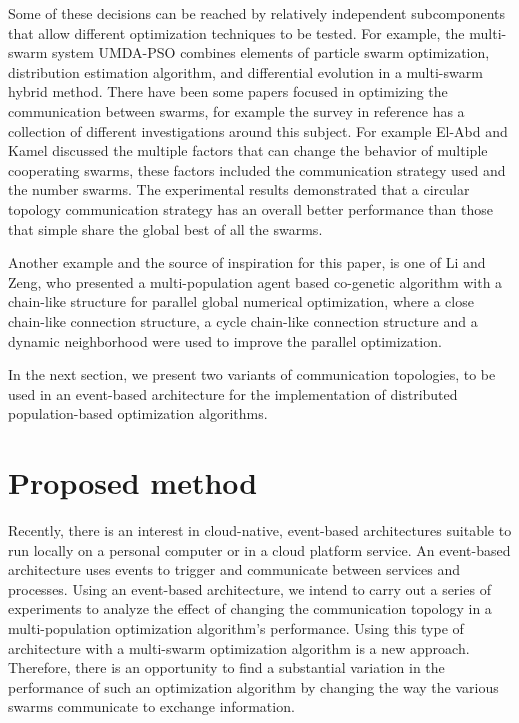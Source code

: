 \documentclass[runningheads]{llncs}
\begin{document}
Some of these decisions can be reached by relatively independent
subcomponents that allow different optimization techniques to be
tested. For example, the multi-swarm system UMDA-PSO \cite{b10}
combines elements of particle swarm optimization, distribution
estimation algorithm, and differential evolution in a multi-swarm
hybrid method. %
There have been some papers focused in optimizing the communication
between swarms, for example the survey in reference \cite{b15} has a
collection of different investigations around this subject. For
example El-Abd and Kamel discussed the multiple factors that can
change the behavior of multiple cooperating swarms, these factors
included the communication strategy used and the number swarms. The
experimental results demonstrated that a circular topology
communication strategy has an overall better performance than those
that simple share the global best of all the swarms\cite{b16}. 

Another example and the source of inspiration for this paper, is one
of Li and Zeng, who presented a multi-population agent based
co-genetic algorithm with a chain-like structure for parallel global
numerical optimization, where a close chain-like connection structure,
a cycle chain-like connection structure and a dynamic neighborhood
were used to improve the parallel optimization\cite{b17}. 

In the next section, we present two variants of communication topologies,
to be used in an event-based architecture for the implementation of 
distributed population-based optimization algorithms.

\section{Proposed method}

Recently, there is an interest in cloud-native, event-based architectures
suitable to run locally on a personal computer or in a cloud platform service.
An event-based architecture uses events to trigger and communicate between
services and processes. Using an event-based architecture, we intend to carry
out a series of experiments to analyze the effect of changing the communication
topology in a multi-population optimization algorithm's performance. Using this
type of architecture with a multi-swarm optimization algorithm is a new
approach. Therefore, there is an opportunity to find a substantial variation in
the performance of such an optimization algorithm by changing the way the
various swarms communicate to exchange information.
\end{document}
